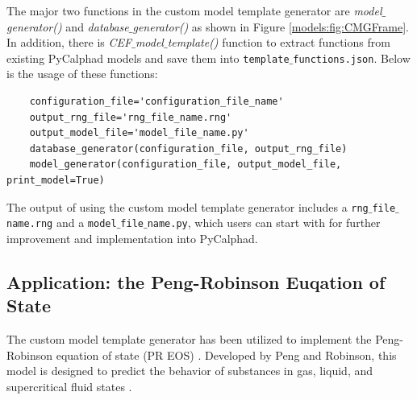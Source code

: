 The major two functions in the custom model template generator are \textit{model$\_$generator()} and \textit{database$\_$generator()} as shown in Figure \ref{models:fig:CMGFrame}. In addition, there is \textit{CEF$\_$model$\_$template()} function to extract functions from existing PyCalphad models and save them into \texttt{template$\_$functions.json}. Below is the usage of these functions:
\begin{verbatim}
    configuration_file='configuration_file_name'
    output_rng_file='rng_file_name.rng'
    output_model_file='model_file_name.py'
    database_generator(configuration_file, output_rng_file)
    model_generator(configuration_file, output_model_file, print_model=True)
\end{verbatim}
The output of using the custom model template generator includes a \texttt{rng$\_$file$\_$name.rng} and a \texttt{model$\_$file$\_$name.py}, which users can start with for further improvement and implementation into PyCalphad.

\subsection{Application: the Peng-Robinson Euqation of State} \label{models:ssec:CMTGapp} %
The custom model template generator has been utilized to implement the Peng-Robinson equation of state (PR EOS) \cite{peng1976new}. Developed by Peng and Robinson, this model is designed to predict the behavior of substances in gas, liquid, and supercritical fluid states \cite{peng1976new}. 

